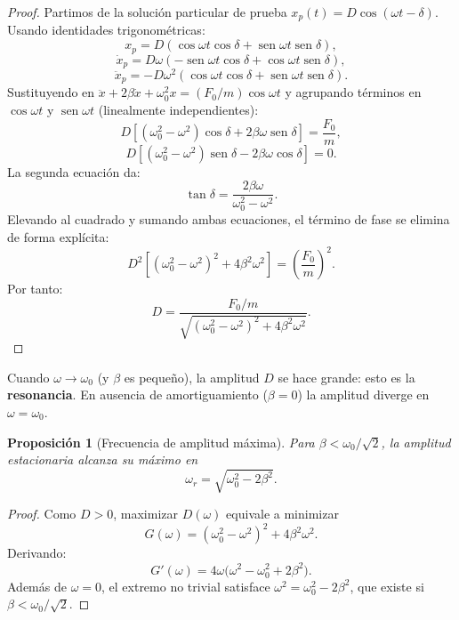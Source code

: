 \documentclass[12pt, a4paper]{article}
\theoremstyle{plain}
\newtheorem{proposicion}[teorema]{Proposición}
\theoremstyle{definition}
\theoremstyle{remark}
\DeclareMathOperator{\sen}{sen}
\begin{document}
\begin{proof}
Partimos de la solución particular de prueba
$x_p(t)=D\cos(\omega t-\delta)$. Usando identidades trigonométricas:
\begin{equation}
  x_p=D(\cos\omega t\cos\delta+\sen\omega t\sen\delta),
\end{equation}
\begin{equation}
  \dot{x}_p=D\omega(-\sen\omega t\cos\delta+\cos\omega t\sen\delta),
\end{equation}
\begin{equation}
  \ddot{x}_p=-D\omega^2(\cos\omega t\cos\delta+\sen\omega t\sen\delta).
\end{equation}
Sustituyendo en
$\ddot{x}+2\beta\dot{x}+\omega_0^2x=(F_0/m)\cos\omega t$ y agrupando términos en
$\cos\omega t$ y $\sen\omega t$ (linealmente independientes):
\begin{equation}
  D\left[(\omega_0^2-\omega^2)\cos\delta+2\beta\omega\sen\delta\right]
  =\frac{F_0}{m},
\end{equation}
\begin{equation}
  D\left[(\omega_0^2-\omega^2)\sen\delta-2\beta\omega\cos\delta\right]=0.
\end{equation}
La segunda ecuación da:
\begin{equation}
  \tan\delta=\frac{2\beta\omega}{\omega_0^2-\omega^2}.
\end{equation}
Elevando al cuadrado y sumando ambas ecuaciones, el término de fase se elimina de forma
explícita:
\begin{equation}
  D^2\left[(\omega_0^2-\omega^2)^2+4\beta^2\omega^2\right]
  =\left(\frac{F_0}{m}\right)^2.
\end{equation}
Por tanto:
\begin{equation}
  D=\frac{F_0/m}{\sqrt{(\omega_0^2-\omega^2)^2+4\beta^2\omega^2}}.
\end{equation}
\end{proof}

Cuando $\omega \to \omega_0$ (y $\beta$ es pequeño), la amplitud $D$ se hace grande:
esto es la \textbf{resonancia}. En ausencia de amortiguamiento ($\beta = 0$) la amplitud
diverge en $\omega = \omega_0$.
\begin{proposicion}[Frecuencia de amplitud máxima]
Para $\beta<\omega_0/\sqrt{2}$, la amplitud estacionaria alcanza su máximo en
\[
  \omega_r=\sqrt{\omega_0^2-2\beta^2}.
\]
\end{proposicion}

\begin{proof}
Como $D>0$, maximizar $D(\omega)$ equivale a minimizar
\[
  G(\omega)=(\omega_0^2-\omega^2)^2+4\beta^2\omega^2.
\]
Derivando:
\[
  G'(\omega)=4\omega\bigl(\omega^2-\omega_0^2+2\beta^2\bigr).
\]
Además de $\omega=0$, el extremo no trivial satisface
$\omega^2=\omega_0^2-2\beta^2$, que existe si $\beta<\omega_0/\sqrt{2}$.
\end{proof}
\end{document}
